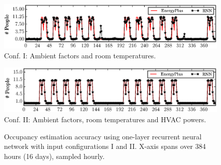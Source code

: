 \begin{figure}[h]
\begin{minipage}{\textwidth}
\centering\includegraphics[width=5in]{figs/results/1LRoomTOnlyDPFAugW3-4}
Conf. I: Ambient factors and room temperatures.
\end{minipage}
\hfill

\vspace{3ex}

\noindent\begin{minipage}{\textwidth}
\centering\includegraphics[width=5in]{figs/results/1LAmbHVACDPFAugW3-4}
Conf. II: Ambient factors, room temperatures and HVAC powers.
\end{minipage}
\hfill
    \caption{\textcolor{feb18rev}{Occupancy estimation accuracy using one-layer recurrent neural
    network with input configurations I and II. X-axis
    spans over 384 hours (16 days), sampled hourly.}}\label{fig:one-layer}
\end{figure}

